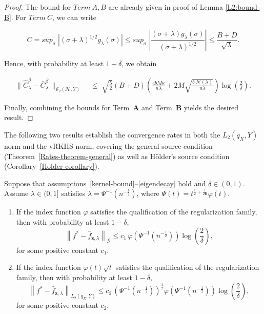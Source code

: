 \documentclass[twoside,11pt]{article}
\begin{document}
\begin{proof}
\noindent
The bound for $Term~A,B$ are already given in proof of Lemma \ref{L2:bound-B}. For $Term~C$, we can write

\[
C = {sup}_\sigma \; | (\sigma +\lambda)^{1/2} g_\lambda(\sigma)| \leq {sup}_\sigma \; \left| \frac{ (\sigma +\lambda) g_\lambda(\sigma)}{(\sigma +\lambda)^{1/2}}\right| \leq \frac{B+D}{\sqrt{\lambda}}.   \]

\noindent
Hence, with probability at least $1-\delta$, we obtain

\begin{align*}
\bigl\|  \widehat{C}_\lambda^\beta-\bar{C}_{\lambda}^\beta\,  \bigr\|_{\mathcal  S_2(\mathcal H,Y)}
\;&\leq\;
\sqrt{\frac{5}{2}}(B+D)\left(
\frac{4bM\kappa}{n{\lambda}}
+ 2
M\sqrt{
\frac{b \; \mathcal{N}(\lambda)}{n\lambda}
}
\right)\log\!\left( \frac{2}{\delta} \right)
.
\end{align*}

\noindent
Finally, combining the bounds for Term~\textbf{A} and Term~\textbf{B} yields the desired result.

\end{proof}


The following two results establish the convergence rates in both the \(L_{2}(q_X,{Y})\) norm and the vRKHS norm, covering the general source condition (Theorem~\ref{Rates-theorem-general}) as well as Hölder's source condition (Corollary~\ref{Holder-corollary}).












\begin{theorem}\label{Rates-theorem-general}
Suppose that {assumptions~\ref{kernel-bound}--\ref{eigendecay}} hold and  $ \delta \in (0,  1)$. 
Assume $\lambda \in (0,1]$ satisfies $\lambda = \Psi^{-1}(n^{-\frac{1}{2}})$, 
where $\Psi(t) = t^{\frac{1}{2} + \frac{1}{2\mathbf{b}}} \varphi(t)$.

\begin{enumerate}
\renewcommand{\labelenumi}{(\roman{enumi})}

\item
If the index function $\varphi$ satisfies the qualification of the regularization family, then with probability at least $1-\delta$,
\[
\left\|f^*-\widehat{f}_{\mathbf z,\lambda}\right\|_{\mathcal G}
\leq
c_1\,
\varphi\!\left(\Psi^{-1}\!\left(n^{-\frac{1}{2}}\right)\right)
\log\!\left(\frac{2}{\delta}\right),
\]
for some positive constant $c_1$.

\item
If the index function $\varphi(t)\sqrt{t}$ satisfies the qualification of the regularization family, then with probability at least $1-\delta$,
\[
\left\|f^*-\widehat{f}_{\mathbf z,\lambda}\right\|_{L_2(q_X,Y)}
\leq
c_2\,
\left(\Psi^{-1}\!\left(n^{-\frac{1}{2}}\right)\right)^{\frac{1}{2}}
\varphi\!\left(\Psi^{-1}\!\left(n^{-\frac{1}{2}}\right)\right)
\log\!\left(\frac{2}{\delta}\right),
\]
for some positive constant $c_2$.

\end{enumerate}


\end{theorem}
\end{document}
